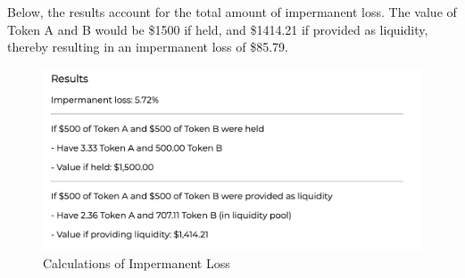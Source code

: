 \documentclass[12pt]{article}
\begin{document}
Below, the results account for the total amount of impermanent loss. The value of Token A and B would be \$1500 if held, and \$1414.21 if provided as liquidity, thereby resulting in an impermanent loss of \$85.79.

\begin{figure}[H]
    \centering
    \includegraphics[width=0.6\linewidth]{results.png}
    \caption{Calculations of Impermanent Loss}
    \label{fig:calculations}
\end{figure}

\newpage
\end{document}

